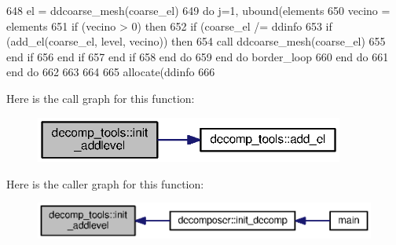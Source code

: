 \begin{DoxyCode}
648                           el = ddcoarse_mesh(coarse\_el)%
649                           \textcolor{keywordflow}{do} j=1, ubound(elements%
650                             vecino = elements%
651                             \textcolor{keywordflow}{if} (vecino > 0) \textcolor{keywordflow}{then}
652                               \textcolor{keywordflow}{if} (coarse\_el /= ddinfo%
653                                 \textcolor{keywordflow}{if} (add\_el(coarse\_el, level, vecino)) \textcolor{keywordflow}{then}
654                                   \textcolor{keyword}{call }ddcoarse_mesh(coarse\_el)%
655 \textcolor{keywordflow}{                                end if}
656 \textcolor{keywordflow}{                              end if}
657 \textcolor{keywordflow}{                            end if}
658 \textcolor{keywordflow}{                          end do} 
659 \textcolor{keywordflow}{          end do} border\_loop
660 \textcolor{keywordflow}{        end do}
661 \textcolor{keywordflow}{      end do}
662       
663  
664  
665       \textcolor{keyword}{allocate}(ddinfo%
666 
\end{DoxyCode}


Here is the call graph for this function\+:\nopagebreak
\begin{figure}[H]
\begin{center}
\leavevmode
\includegraphics[width=288pt]{namespacedecomp__tools_a41644413ba4175d7d78e741e2f367bc2_cgraph}
\end{center}
\end{figure}




Here is the caller graph for this function\+:\nopagebreak
\begin{figure}[H]
\begin{center}
\leavevmode
\includegraphics[width=350pt]{namespacedecomp__tools_a41644413ba4175d7d78e741e2f367bc2_icgraph}
\end{center}
\end{figure}


